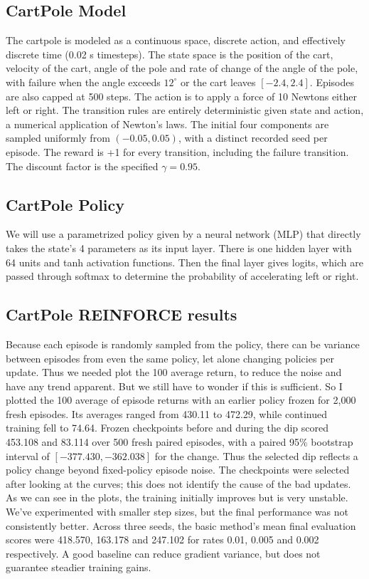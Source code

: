 \documentclass{article}
\begin{document}
\subsection{CartPole Model}
The cartpole is modeled as a continuous space, discrete action, and effectively discrete time (0.02 s timesteps). The state space is the position of the cart, velocity of the cart, angle of the pole and rate of change of the angle of the pole, with failure when the angle exceeds $12^\circ$ or the cart leaves $[-2.4,2.4]$. Episodes are also capped at 500 steps. The action is to apply a force of 10 Newtons either left or right. The transition rules are entirely deterministic given state and action, a numerical application of Newton's laws. The initial four components are sampled uniformly from $(-0.05,0.05)$, with a distinct recorded seed per episode. The reward is +1 for every transition, including the failure transition. The discount factor is the specified $\gamma=0.95$.

\subsection{CartPole Policy}
We will use a parametrized policy given by a neural network (MLP) that directly takes the state's 4 parameters as its input layer. There is one hidden layer with 64 units and tanh activation functions. Then the final layer gives logits, which are passed through softmax to determine the probability of accelerating left or right.

\subsection{CartPole REINFORCE results}
Because each episode is randomly sampled from the policy, there can be variance between episodes from even the same policy, let alone changing policies per update. Thus we needed plot the 100 average return, to reduce the noise and have any trend apparent. But we still have to wonder if this is sufficient. So I plotted the 100 average of episode returns with an earlier policy frozen for 2,000 fresh episodes. Its averages ranged from 430.11 to 472.29, while continued training fell to 74.64. Frozen checkpoints before and during the dip scored 453.108 and 83.114 over 500 fresh paired episodes, with a paired 95\% bootstrap interval of $[-377.430,-362.038]$ for the change. Thus the selected dip reflects a policy change beyond fixed-policy episode noise. The checkpoints were selected after looking at the curves; this does not identify the cause of the bad updates.
As we can see in the plots, the training initially improves but is very unstable. We've experimented with smaller step sizes, but the final performance was not consistently better. Across three seeds, the basic method's mean final evaluation scores were 418.570, 163.178 and 247.102 for rates 0.01, 0.005 and 0.002 respectively. A good baseline can reduce gradient variance, but does not guarantee steadier training gains.
\end{document}
